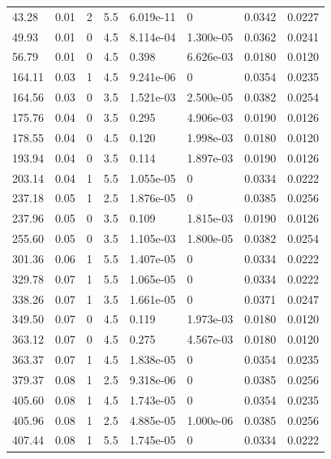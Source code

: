 \documentclass[preview]{standalone}
\begin{document}
{{\begin{tabular}{L{1.2cm}C{1.2cm} C{0.3cm}C{0.5cm} C{1.4cm}C{1.4cm} C{1.4cm}C{1.4cm}}
  43.28  &  0.01  & 2     & 5.5 &  6.019e-11  & 0  & 0.0342 &  0.0227   \\ 
  49.93  &  0.01  & 0     & 4.5 &  8.114e-04  & 1.300e-05  & 0.0362 &  0.0241   \\ 
  56.79  &  0.01  & 0     & 4.5 &  0.398  & 6.626e-03  & 0.0180 &  0.0120   \\ 
  164.11  &  0.03  & 1     & 4.5 &  9.241e-06  & 0  & 0.0354 &  0.0235   \\ 
  164.56  &  0.03  & 0     & 3.5 &  1.521e-03  & 2.500e-05  & 0.0382 &  0.0254   \\ 
  175.76  &  0.04  & 0     & 3.5 &  0.295  & 4.906e-03  & 0.0190 &  0.0126   \\ 
  178.55  &  0.04  & 0     & 4.5 &  0.120  & 1.998e-03  & 0.0180 &  0.0120   \\ 
  193.94  &  0.04  & 0     & 3.5 &  0.114  & 1.897e-03  & 0.0190 &  0.0126   \\ 
  203.14  &  0.04  & 1     & 5.5 &  1.055e-05  & 0  & 0.0334 &  0.0222   \\ 
  237.18  &  0.05  & 1     & 2.5 &  1.876e-05  & 0  & 0.0385 &  0.0256   \\ 
  237.96  &  0.05  & 0     & 3.5 &  0.109  & 1.815e-03  & 0.0190 &  0.0126   \\ 
  255.60  &  0.05  & 0     & 3.5 &  1.105e-03  & 1.800e-05  & 0.0382 &  0.0254   \\ 
  301.36  &  0.06  & 1     & 5.5 &  1.407e-05  & 0  & 0.0334 &  0.0222   \\ 
  329.78  &  0.07  & 1     & 5.5 &  1.065e-05  & 0  & 0.0334 &  0.0222   \\ 
  338.26  &  0.07  & 1     & 3.5 &  1.661e-05  & 0  & 0.0371 &  0.0247   \\ 
  349.50  &  0.07  & 0     & 4.5 &  0.119  & 1.973e-03  & 0.0180 &  0.0120   \\ 
  363.12  &  0.07  & 0     & 4.5 &  0.275  & 4.567e-03  & 0.0180 &  0.0120   \\ 
  363.37  &  0.07  & 1     & 4.5 &  1.838e-05  & 0  & 0.0354 &  0.0235   \\ 
  379.37  &  0.08  & 1     & 2.5 &  9.318e-06  & 0  & 0.0385 &  0.0256   \\ 
  405.60  &  0.08  & 1     & 4.5 &  1.743e-05  & 0  & 0.0354 &  0.0235   \\ 
  405.96  &  0.08  & 1     & 2.5 &  4.885e-05  & 1.000e-06  & 0.0385 &  0.0256   \\ 
  407.44  &  0.08  & 1     & 5.5 &  1.745e-05  & 0  & 0.0334 &  0.0222   \\ 

\end{tabular}}}
\end{document}
